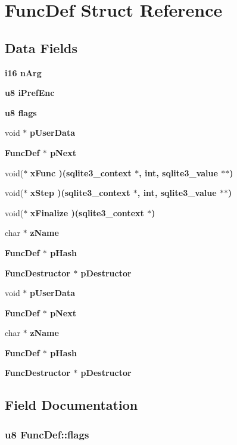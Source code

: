 \section{Func\-Def Struct Reference}
\label{structFuncDef}
\subsection*{Data Fields}
\begin{CompactItemize}
\item 
\bf{i16} \bf{n\-Arg}
\item 
\bf{u8} \bf{i\-Pref\-Enc}
\item 
\bf{u8} \bf{flags}
\item 
void $\ast$ \bf{p\-User\-Data}
\item 
\bf{Func\-Def} $\ast$ \bf{p\-Next}
\item 
void($\ast$ \bf{x\-Func} )(\bf{sqlite3\_\-context} $\ast$, int, \bf{sqlite3\_\-value} $\ast$$\ast$)
\item 
void($\ast$ \bf{x\-Step} )(\bf{sqlite3\_\-context} $\ast$, int, \bf{sqlite3\_\-value} $\ast$$\ast$)
\item 
void($\ast$ \bf{x\-Finalize} )(\bf{sqlite3\_\-context} $\ast$)
\item 
char $\ast$ \bf{z\-Name}
\item 
\bf{Func\-Def} $\ast$ \bf{p\-Hash}
\item 
\bf{Func\-Destructor} $\ast$ \bf{p\-Destructor}
\item 
void $\ast$ \bf{p\-User\-Data}
\item 
\bf{Func\-Def} $\ast$ \bf{p\-Next}
\item 
char $\ast$ \bf{z\-Name}
\item 
\bf{Func\-Def} $\ast$ \bf{p\-Hash}
\item 
\bf{Func\-Destructor} $\ast$ \bf{p\-Destructor}
\end{CompactItemize}


\subsection{Field Documentation}
\subsubsection{\setlength{\rightskip}{0pt plus 5cm}\bf{u8} \bf{Func\-Def::flags}}\label{structFuncDef_b4203e967bb668de1288039d2b0b8b3d}


